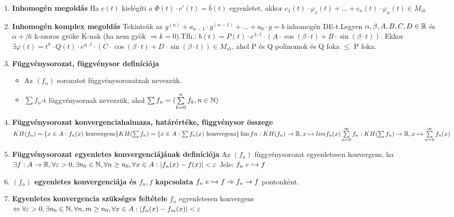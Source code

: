 \documentclass{article}
\begin{document}
\begin{enumerate}
	\item\textbf{Inhomogén megoldás}\br
	Ha $c(t)$ kielégíti a $\Phi(t)\cdot c'(t) = \bar{b}(t)$ egyenletet, akkor
	$c_1(t)\cdot\varphi_1(t)+...+c_n(t)\cdot\varphi_n(t)\in M_{ih}$
	
	\item\textbf{Inhomogén komplex megoldás}\br
	Tekintsük az $y^{(n)}+a_{n-1}\cdot y^{(n-1)}+...+a_0\cdot y=b$ inhomogén
	DE-t.\br Legyen $\alpha,\beta,A,B,C,D\in\mathbb{R}$ és $\alpha+\beta i$ k-szoros
	gyöke K-nak (ha nem gyök $\Rightarrow k=0$).\br Tfh.: $b(t)=P(t)\cdot
	e^{\lambda\cdot t}\cdot(A\cdot \cos(\beta\cdot t)+B\cdot\sin(\beta\cdot t)).$
	\br Ekkor $\exists\varphi(t)=t^k\cdot Q(t)\cdot e^{\alpha\cdot t}
	\cdot(C\cdot\cos(\beta\cdot t)+D\cdot\sin(\beta\cdot t))\in M_{ih}$,
	\br ahol P és Q polinomok és Q foka $\leq$ P foka.
	\newpage
	
	\item\textbf{Függvénysorozat, függvénysor definíciója}
	\begin{itemize}
		\item Az $(f_n)$ sorozatot függvénysorozatnak nevezzük.
		\item$\sum f_n$-t függvénysornak nevezzük, ahol $\sum f_n=
		(\sum\limits_{k=0}^n f_k, n\in\mathbb{N})$
	\end{itemize}

	\item\textbf{Függvénysorozat konvergenciahalmaza, határértéke, függvénysor összege}\br
	$KH(f_n)=\{x\in A:f_n(x)\text{ konvergens}\}\br
	KH(\sum f_n)=\{x\in A:\sum f_n(x)\text{ konvergens}\}\br
	\lim fn:KH(f_n)\rightarrow\R,x\mapsto lim f_n(x)\br
	\sum\limits_{n=0}^\infty f_n:KH(\sum f_n)\rightarrow\R,x\mapsto
	\sum\limits_{n=0}^\infty f_n(x)$
	
	\item\textbf{Függvénysorozat egyenletes konvergenciájának definíciója}\br
	Az $(f_n)$ függvénysorozat egyenletesen konvergens, ha\br$\exists f:A\rightarrow
	\mathbb{R},\forall\varepsilon>0,\exists n_0\in\mathbb{N},\forall n\geq n_0,\forall x\in A:
	\abs{f_n(x) - f(x)}< \varepsilon$\br
	Jele: $f_n \text{ }e\hookrightarrow f$
	
	\item\textbf{$(f_n)$ egyenletes konvergenciája és $f_n,f$ kapcsolata}\br
	$f_n\text{ }e\hookrightarrow f
	\Rightarrow f_n\rightarrow f$ pontonként.
	
	\item\textbf{Egyenletes konvergencia szükséges feltétele}\br
	$f_n$ egyenletesen konvergens $\Leftrightarrow\forall\varepsilon>0,
	\exists n_0\in\mathbb{N},\forall n,m\geq n_0,\forall x\in A:\abs{f_n(x) - f_m(x)}< \varepsilon$
	

\end{enumerate}
\end{document}
